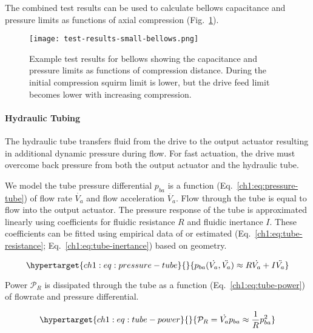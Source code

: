 The combined test results can be used to calculate bellows capacitance
and pressure limits as functions of axial compression
(Fig.~\ref{ch1:fig:results-bellows-small}).

\begin{figure}
\hypertarget{ch1:fig:results-bellows-small}{%
\centering
\texttt{[image: test-results-small-bellows.png]}
\caption{Example test results for bellows showing the capacitance and
pressure limits as functions of compression distance. During the initial
compression squirm limit is lower, but the drive feed limit becomes
lower with increasing compression.}\label{ch1:fig:results-bellows-small}
}
\end{figure}



\hypertarget{ch1:hydraulic-tubing}{%
\paragraph{Hydraulic Tubing}\label{ch1:hydraulic-tubing}}

The hydraulic tube transfers fluid from the drive to the output actuator
resulting in additional dynamic pressure during flow. For fast
actuation, the drive must overcome back pressure from both the output
actuator and the hydraulic tube.

We model the tube pressure differential \(p_{ba}\) is a function
(Eq.~\ref{ch1:eq:pressure-tube}) of flow rate \(\dot{V_a}\) and flow
acceleration \(\ddot{V_a}\). Flow through the tube is equal to flow into
the output actuator. The pressure response of the tube is approximated
linearly using coefficients for fluidic resistance \(R\) and fluidic
inertance \(I\). These coefficients can be fitted using empirical data
of or estimated (Eq.~\ref{ch1:eq:tube-resistance};
Eq.~\ref{ch1:eq:tube-inertance}) based on geometry.

\begin{equation}\protect\hypertarget{ch1:eq:pressure-tube}{}{ p_{ba}(\dot{V_a}, \ddot{V_a})   
\approx R \dot{V_a} + I \ddot{V_a}   
}\label{ch1:eq:pressure-tube}\end{equation}

Power \(\mathcal{P}_R\) is dissipated through the tube as a function
(Eq.~\ref{ch1:eq:tube-power}) of flowrate and pressure differential.

\begin{equation}\protect\hypertarget{ch1:eq:tube-power}{}{ \mathcal{P}_R = \dot{V_a}p_{ba}   
\approx \frac{1}{R}p_{ba}^2   
}\label{ch1:eq:tube-power}\end{equation}


